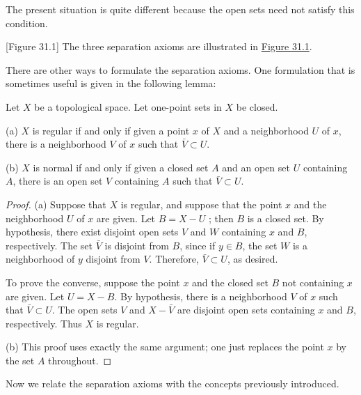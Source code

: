 The present situation is quite different because the open sets need not satisfy this condition.

[Figure 31.1]
The three separation axioms are illustrated in \hyperref[fig:31.1]{Figure 31.1}.

There are other ways to formulate the separation axioms. One formulation that is sometimes useful is given in the following lemma:

\begin{lemma}
\label{lem:\thetheorem}
 Let \(X\) be a topological space. Let one-point sets in \(X\) be closed.

(a) \(X\) is regular if and only if given a point \(x\) of \(X\) and a neighborhood \(U\) of \(x\), there is a neighborhood \(V\) of \(x\) such that \(\bar{V} \subset U\).

(b) \(X\) is normal if and only if given a closed set \(A\) and an open set \(U\) containing \(A\), there is an open set \(V\) containing \(A\) such that \(\bar{V} \subset U\).
\end{lemma}

\begin{proof}
(a) Suppose that \(X\) is regular, and suppose that the point \(x\) and the neighborhood \(U\) of \(x\) are given. Let \(B = X - U\) ; then \(B\) is a closed set. By hypothesis, there exist disjoint open sets \(V\) and \(W\) containing \(x\) and \(B\), respectively. The set \(\bar{V}\) is disjoint from \(B\), since if \(y \in B\), the set \(W\) is a neighborhood of \(y\) disjoint from \(V\). Therefore, \(\bar{V} \subset U\), as desired.

To prove the converse, suppose the point \(x\) and the closed set \(B\) not containing \(x\) are given. Let \(U = X - B\). By hypothesis, there is a neighborhood \(V\) of \(x\) such that \(\bar{V} \subset U\). The open sets \(V\) and \(X - \bar{V}\) are disjoint open sets containing \(x\) and \(B\), respectively. Thus \(X\) is regular.

(b) This proof uses exactly the same argument; one just replaces the point \(x\) by the set \(A\) throughout.
\end{proof}

Now we relate the separation axioms with the concepts previously introduced.

